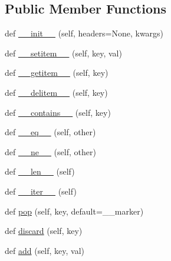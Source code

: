\subsection*{Public Member Functions}
\begin{DoxyCompactItemize}
\item 
def \hyperlink{classpip_1_1__vendor_1_1urllib3_1_1__collections_1_1HTTPHeaderDict_aae62049ce21da994548fce43dcfcf6a6}{\+\_\+\+\_\+init\+\_\+\+\_\+} (self, headers=None, kwargs)
\item 
def \hyperlink{classpip_1_1__vendor_1_1urllib3_1_1__collections_1_1HTTPHeaderDict_ab1dfb08764252d6536e4ec37c019adbf}{\+\_\+\+\_\+setitem\+\_\+\+\_\+} (self, key, val)
\item 
def \hyperlink{classpip_1_1__vendor_1_1urllib3_1_1__collections_1_1HTTPHeaderDict_a51d531654b9c08f2d8b1c95979ca8cfe}{\+\_\+\+\_\+getitem\+\_\+\+\_\+} (self, key)
\item 
def \hyperlink{classpip_1_1__vendor_1_1urllib3_1_1__collections_1_1HTTPHeaderDict_a01b396334c3e0f7eafb8bf512d32bfdc}{\+\_\+\+\_\+delitem\+\_\+\+\_\+} (self, key)
\item 
def \hyperlink{classpip_1_1__vendor_1_1urllib3_1_1__collections_1_1HTTPHeaderDict_af8050c56a33264f29935dd70d515b26d}{\+\_\+\+\_\+contains\+\_\+\+\_\+} (self, key)
\item 
def \hyperlink{classpip_1_1__vendor_1_1urllib3_1_1__collections_1_1HTTPHeaderDict_a7df69a01e45cf533084c369341635e91}{\+\_\+\+\_\+eq\+\_\+\+\_\+} (self, other)
\item 
def \hyperlink{classpip_1_1__vendor_1_1urllib3_1_1__collections_1_1HTTPHeaderDict_a3f4d576e6b092d091cedfd92fe4becb2}{\+\_\+\+\_\+ne\+\_\+\+\_\+} (self, other)
\item 
def \hyperlink{classpip_1_1__vendor_1_1urllib3_1_1__collections_1_1HTTPHeaderDict_ac6e68f9b611a6cb9d922af73be339631}{\+\_\+\+\_\+len\+\_\+\+\_\+} (self)
\item 
def \hyperlink{classpip_1_1__vendor_1_1urllib3_1_1__collections_1_1HTTPHeaderDict_a7c35286a079e737a877788602b371b34}{\+\_\+\+\_\+iter\+\_\+\+\_\+} (self)
\item 
def \hyperlink{classpip_1_1__vendor_1_1urllib3_1_1__collections_1_1HTTPHeaderDict_ab974fff44f7effe49e33988819baa26e}{pop} (self, key, default=\+\_\+\+\_\+marker)
\item 
def \hyperlink{classpip_1_1__vendor_1_1urllib3_1_1__collections_1_1HTTPHeaderDict_ad5458dfb9ad20fd57766d52e1e06b0ce}{discard} (self, key)
\item 
def \hyperlink{classpip_1_1__vendor_1_1urllib3_1_1__collections_1_1HTTPHeaderDict_a935f3bc67583fcae60019eb5faa0bcb1}{add} (self, key, val)

\end{DoxyCompactItemize}
